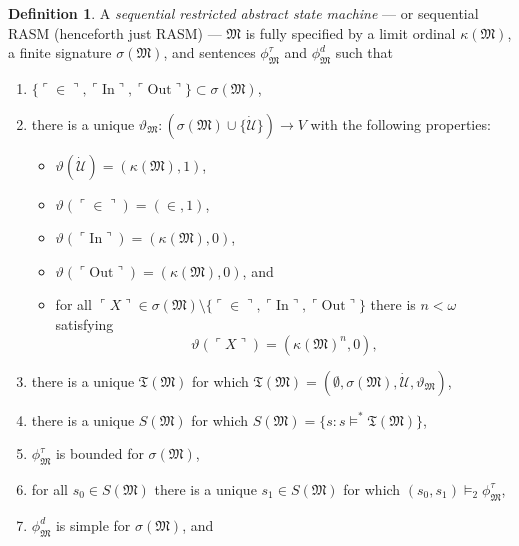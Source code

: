 \documentclass[12pt, twoside]{memoir}
\numberwithin{equation}{section}
\theoremstyle{definition}
\newtheorem{defi}[thm]{Definition}
\theoremstyle{remark}
\theoremstyle{definition}
\theoremstyle{definition}
\theoremstyle{definition}
\theoremstyle{remark}
\begin{document}
\begin{defi}\label{def224}
A \emph{sequential restricted abstract state machine} --- or sequential RASM (henceforth just RASM) --- $\mathfrak{M}$ is fully specified by a limit ordinal $\kappa(\mathfrak{M})$, a finite signature $\sigma(\mathfrak{M})$, and sentences $\phi^{\tau}_{\mathfrak{M}}$ and $\phi^d_{\mathfrak{M}}$ such that
\begin{enumerate}[label=(D\arabic*)]
    \item $\{\ulcorner \in \urcorner, \ulcorner \mathrm{In} \urcorner, \ulcorner \mathrm{Out} \urcorner\} \subset \sigma(\mathfrak{M})$,
    \item there is a unique $\vartheta_{\mathfrak{M}} : (\sigma(\mathfrak{M}) \cup \{\dot{\mathcal{U}}\}) \longrightarrow V$ with the following properties:
    \begin{itemize}
        \item $\vartheta(\dot{\mathcal{U}}) = (\kappa(\mathfrak{M}), 1)$,
        \item $\vartheta(\ulcorner \in \urcorner) = (\in, 1)$,
        \item $\vartheta(\ulcorner \mathrm{In} \urcorner) = (\kappa(\mathfrak{M}), 0)$,
        \item $\vartheta(\ulcorner \mathrm{Out} \urcorner) = (\kappa(\mathfrak{M}), 0)$, and
        \item for all $\ulcorner X \urcorner \in \sigma(\mathfrak{M}) \setminus \{\ulcorner \in \urcorner, \ulcorner \mathrm{In} \urcorner, \ulcorner \mathrm{Out} \urcorner\}$ there is $n < \omega$ satisfying 
        \begin{equation*}
            \vartheta(\ulcorner X \urcorner) = (\kappa(\mathfrak{M})^n, 0) \text{,}
        \end{equation*}
    \end{itemize}
    \item there is a unique $\mathfrak{T}(\mathfrak{M})$ for which $\mathfrak{T}(\mathfrak{M}) = (\emptyset, \sigma(\mathfrak{M}), \dot{\mathcal{U}}, \vartheta_{\mathfrak{M}})$,
    \item there is a unique $S(\mathfrak{M})$ for which $S(\mathfrak{M}) = \{s : s \models^* \mathfrak{T}(\mathfrak{M})\}$,
    \item $\phi^{\tau}_{\mathfrak{M}}$ is bounded for $\sigma(\mathfrak{M})$, 
    \item for all $s_0 \in S(\mathfrak{M})$ there is a unique $s_1 \in S(\mathfrak{M})$ for which $(s_0, s_1) \models_2 \phi^{\tau}_{\mathfrak{M}}$,
    \item $\phi^d_{\mathfrak{M}}$ is simple for $\sigma(\mathfrak{M})$, and

\end{enumerate}
\end{defi}
\end{document}
